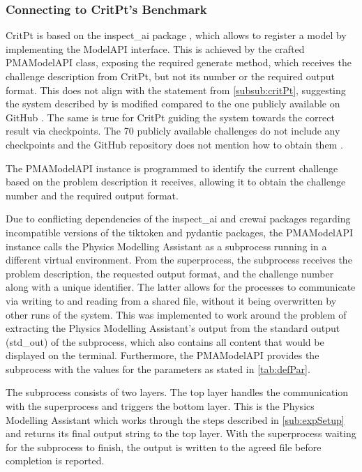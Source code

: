 \documentclass[
	fontsize = 11pt,
	paper = a4,
	draft = false,
	twoside = true,
	titlepage = false
]{scrartcl}
\numberwithin{equation}{subsection}
\begin{document}
	\subsubsection{Connecting to CritPt's Benchmark}
	CritPt is based on the inspect\_ai package \autocite{inspectAI_UK_AI_Security_Institute_Inspect_AI_Framework_2024}, which allows to register a model by implementing the ModelAPI interface. This is achieved by the crafted PMAModelAPI class, exposing the required generate method, which receives the challenge description from CritPt, but not its number or the required output format. This does not align with the statement from \autoref{subsub:critPt}, suggesting the system described by \citeauthor{critPtArx} \autocite{critPtArx} is modified compared to the one publicly available on GitHub \autocite{critptGit}. The same is true for CritPt guiding the system towards the correct result via checkpoints. The 70 publicly available challenges do not include any checkpoints and the GitHub repository does not mention how to obtain them \autocite{critptGit}.
	
	The PMAModelAPI instance is programmed to identify the current challenge based on the problem description it receives, allowing it to obtain the challenge number and the required output format. 
	
	Due to conflicting dependencies of the inspect\_ai and crewai packages regarding incompatible versions of the tiktoken and pydantic packages, the PMAModelAPI instance calls the Physics Modelling Assistant as a subprocess running in a different virtual environment. From the superprocess, the subprocess receives the problem description, the requested output format, and the challenge number along with a unique identifier. The latter allows for the processes to communicate via writing to and reading from a shared file, without it being overwritten by other runs of the system. This was implemented to work around the problem of extracting the Physics Modelling
	Assistant’s output from the standard output (std\_out) of the subprocess, which also contains all content that would be displayed on the terminal. Furthermore, the PMAModelAPI provides the subprocess with the values for the parameters as stated in \autoref{tab:defPar}.
	
	The subprocess consists of two layers. The top layer handles the communication with the superprocess and triggers the bottom layer. This is the Physics Modelling Assistant which works through the steps described in \autoref{sub:expSetup} and returns its final output string to the top layer. With the superprocess waiting for the subprocess to finish, the output is written to the agreed file before completion is reported.
	
\end{document}
